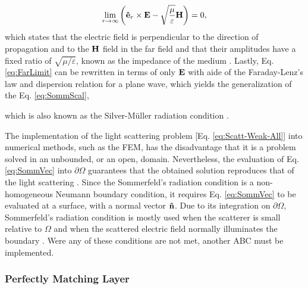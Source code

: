 %
\begin{align}
    \lim_{r\to\infty} \qty(\vu{e}_r\times\vb{E} - \sqrt{\frac{\mu}{\varepsilon}} \vb{H}) = 0,
    \label{eq:FarLimit}
\end{align}
%
%
%
which states that the electric field is perpendicular to the direction of propagation and to the $\vb{H}$ field in the far field and that their amplitudes have a fixed ratio of $\sqrt{{\mu}/{\varepsilon}}$, known as the impedance of the medium \cite{jin_theory_2010,schot_eighty_1992}. Lastly, Eq. \eqref{eq:FarLimit} can be rewritten in terms of only $\vb{E}$ with aide of the Faraday-Lenz's law and dispersion relation for a plane wave, which yields the generalization of the Eq. \eqref{eq:SommScal},
%
%
%
%
%
 \noindent%
which is also known as the Silver-Müller radiation condition \cite{colton_inverse_2019,silver_microwave_1984}.

The implementation of the light scattering problem [Eq. \eqref{eq:Scatt-Weak-All}] into numerical methods, such as the FEM, has the disadvantage that it is a problem solved in an unbounded, or an open, domain. Nevertheless, the evaluation of Eq. \eqref{eq:SommVec} into $\partial\Omega$ guarantees that the obtained solution reproduces that of the light scattering \cite{jin_theory_2010,bondeson_computational_2005}. Since the Sommerfeld's radiation  condition is a non-homogeneous Neumann boundary condition, it  requires Eq. \eqref{eq:SommVec} to be evaluated at a surface, with a normal vector $\vu{n}$. Due to its integration on $\partial\Omega$, Sommerfeld's radiation condition is mostly used when the scatterer  is small relative to  $\Omega$ and when the scattered electric field normally illuminates the boundary \cite{jin_theory_2010,bondeson_computational_2005}.  Were any of these conditions are not met, another ABC must be implemented.

    \subsubsection{Perfectly Matching Layer}


